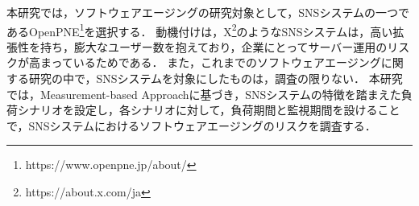\documentclass[twoside,twocolumn,10pt]{jarticle}  %
\begin{document}
本研究では，ソフトウェアエージングの研究対象として，SNSシステムの一つであるOpenPNE\footnote{https://www.openpne.jp/about/}を選択する．
動機付けは，X\footnote{https://about.x.com/ja}のようなSNSシステムは，高い拡張性を持ち，膨大なユーザー数を抱えており，企業にとってサーバー運用のリスクが高まっているためである．
また，これまでのソフトウェアエージングに関する研究の中で，SNSシステムを対象にしたものは，調査の限りない．
本研究では，Measurement-based Approach\cite{Dohi2020Handbook}に基づき，SNSシステムの特徴を踏まえた負荷シナリオを設定し，各シナリオに対して，負荷期間と監視期間\cite{Torquato2018SWAREa}を設けることで，SNSシステムにおけるソフトウェアエージングのリスクを調査する．
\end{document}
